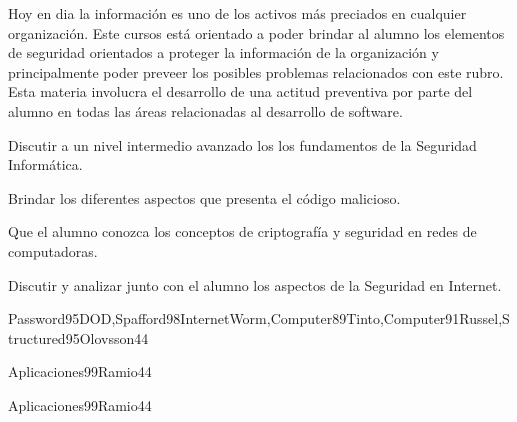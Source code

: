 \begin{syllabus}


\begin{justification}
Hoy en dia la información es uno de los activos más preciados en cualquier organización. 
Este cursos está orientado a poder brindar al alumno los elementos de seguridad orientados a proteger la 
información de la organización y principalmente poder preveer los posibles problemas relacionados con este rubro. 
Esta materia involucra el desarrollo de una actitud preventiva por parte del alumno en todas las áreas 
relacionadas al desarrollo de software.
\end{justification}

\begin{goals}
\item Discutir a un nivel intermedio avanzado los los fundamentos de la Seguridad Informática.
\item Brindar los diferentes aspectos que presenta el código malicioso.
\item Que el alumno conozca los conceptos de criptografía y seguridad en redes de computadoras.
\item Discutir y analizar junto con el alumno los aspectos de la Seguridad en Internet.
\end{goals}

\begin{outcomes}
\end{outcomes}

\begin{unit}{\PFFoundationsInformationSecurityDef}{Password95DOD,Spafford98InternetWorm,Computer89Tinto,Computer91Russel,Structured95Olovsson}{4}{4}
    \PFFoundationsInformationSecurityAllTopics
    \PFFoundationsInformationSecurityAllObjectives
\end{unit}

\begin{unit}{\PFSecureProgrammingDef}{Aplicaciones99Ramio}{4}{4}
    \PFSecureProgrammingAllTopics
    \PFSecureProgrammingAllObjectives
\end{unit}

\begin{unit}{\OSSecurityModelsDef}{Aplicaciones99Ramio}{4}{4}
    \OSSecurityModelsAllTopics
    \OSSecurityModelsAllObjectives
\end{unit}


\end{syllabus}
